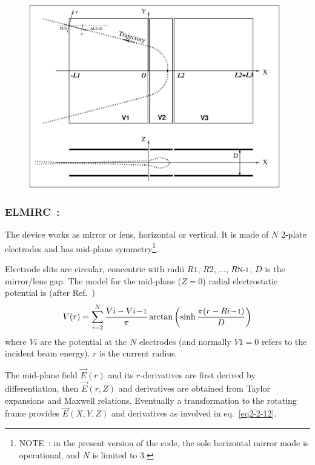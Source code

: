 \begin{figure}[H]
\centerline{\includegraphics[height=8cm]{FigELMIR.eps}}
\hangcaption{\label{figELMIR} \CapELMIR}
\end{figure}

\vfill

\newpage

\subsubsection*{ELMIRC~: \ELMIRCTitl~\cite{Karets}}\label{ELMIRC}
\medskip

The device works as  mirror or lens, horizontal or vertical. 
It is made of $N$ 2-plate electrodes and has mid-plane 
symmetry\footnote{NOTE~: in the present version of the code, the sole horizontal mirror mode 
 is operational, and $N$ is limited to 3.}. 
\bigskip

\noindent Electrode  slits are circular, concentric with  radii  $ R1 $, $ R2 $, ...,   
$ R{\textrm{\footnotesize N-1}}$, 
$D$ is the  mirror/lens gap. The model for the mid-plane ($Z=0$) radial electrostatic potential  
is (after Ref.~\cite[p.443]{Karets})
$$ V(r) = 
   \sum_{i=2}^{N} \dfrac{V{i}-V{i\!-\!\textrm{\footnotesize 1}} }{ \pi} 
     \arctan \left( \sinh \dfrac{ \pi ( r - R{i\!-\!\textrm{\footnotesize 1}})}{D} \right)  
$$
where $V\!i$ are the potential at the $N$ electrodes (and normally $V\!1=0$ refers to
the incident beam energy). $r$ is the current radius. 

 The mid-plane field $ \vec  E(r) $ and its $r$-derivatives are first derived by differentiation, then 
$ \vec  E(r,Z) $ and  derivatives are obtained from Taylor expansions and Maxwell relations. 
Eventually a transformation to the rotating frame provides $\vec  E(X,Y,Z)$ 
 and  derivatives as involved in eq.~\ref{eq2-2-12}. 


